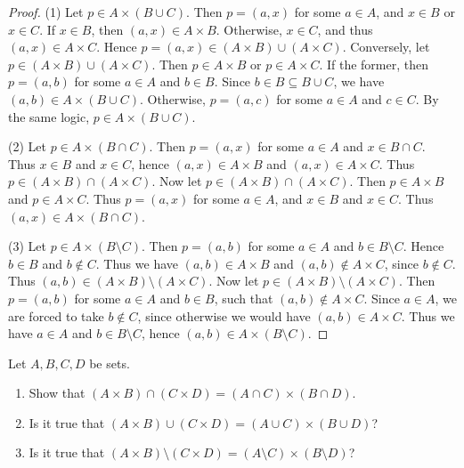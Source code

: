 \documentclass[11pt, letterpaper]{article}
\theoremstyle{definition}
\begin{document}
\begin{proof}
	(1) Let $p\in A\times (B \cup C)$. Then $p=(a,x)$ for some $a\in A$, and $x\in B$ or $x\in C$. If $x\in B$, then $(a,x)\in A\times B$. Otherwise, $x\in C$, and thus $(a,x)\in A\times C$. Hence $p=(a,x)\in (A\times B)\cup (A\times C)$. Conversely, let $p\in (A\times B)\cup (A\times C)$. Then $p\in A\times B$ or $p\in A\times C$. If the former, then $p=(a,b)$ for some $a\in A$ and $b\in B$. Since $b\in B \subseteq B\cup C$, we have $(a,b)\in A\times (B \cup C)$. Otherwise, $p=(a,c)$ for some $a\in A$ and $c\in C$. By the same logic, $p\in A\times (B \cup C)$.

	(2) Let $p\in A\times (B \cap C)$. Then $p=(a,x)$ for some $a\in A$ and $x\in B \cap C$. Thus $x\in B$ and $x\in C$, hence $(a,x)\in A\times B$ and $(a,x)\in A\times C$. Thus $p\in (A\times B)\cap (A\times C)$. Now let $p\in (A\times B)\cap (A\times C)$. Then $p\in A\times B$ and $p\in A\times C$. Thus $p=(a,x)$ for some $a\in A$, and $x\in B$ and $x\in C$. Thus $(a,x)\in A \times (B \cap C)$.

	(3) Let $p\in A\times (B\setminus C)$. Then $p=(a,b)$ for some $a\in A$ and $b\in B\setminus C$. Hence $b\in B$ and $b\notin C$. Thus we have $(a,b)\in A\times B$ and $(a,b)\notin A\times C$, since $b\notin C$. Thus $(a,b)\in (A\times B)\setminus (A\times C)$.  Now let $p\in (A\times B)\setminus (A\times C)$. Then $p=(a,b)$ for some $a\in A$ and $b\in B$, such that $(a,b)\notin A\times C$. Since $a\in A$, we are forced to take $b\notin C$, since otherwise we would have $(a,b)\in A\times C$. Thus we have $a\in A$ and $b\in B\setminus C$, hence $(a,b)\in A\times (B\setminus C)$.
\end{proof}
\begin{problem}[Exercise 3.5.5]
	Let $A,B,C,D$ be sets.
	\begin{enumerate}[label=(\arabic*), align=right]
		\item Show that $(A\times B)\cap (C\times D)=(A \cap C)\times (B \cap D)$.
		\item Is it true that $(A\times B) \cup (C\times D)=(A \cup C)\times (B \cup D)$?
		\item Is it true that $(A\times B)\setminus (C\times D)=(A\setminus C)\times (B\setminus D)$?
	\end{enumerate}
\end{problem}
\end{document}
